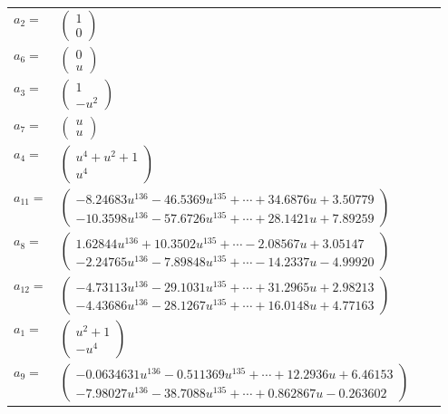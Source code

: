 \documentclass[1p]{elsarticle_modified}
\theoremstyle{definition}
\begin{document}
\begin{tabular}{m{7pt} m{180pt} m{7pt} m{180pt} }
\flushright $a_{2}=$&$\begin{pmatrix}1\\0\end{pmatrix}$ \\
\flushright $a_{6}=$&$\begin{pmatrix}0\\u\end{pmatrix}$ \\
\flushright $a_{3}=$&$\begin{pmatrix}1\\- u^2\end{pmatrix}$ \\
\flushright $a_{7}=$&$\begin{pmatrix}u\\u\end{pmatrix}$ \\
\flushright $a_{4}=$&$\begin{pmatrix}u^4+u^2+1\\u^4\end{pmatrix}$ \\
\flushright $a_{11}=$&$\begin{pmatrix}-8.24683 u^{136}-46.5369 u^{135}+\cdots+34.6876 u+3.50779\\-10.3598 u^{136}-57.6726 u^{135}+\cdots+28.1421 u+7.89259\end{pmatrix}$ \\
\flushright $a_{8}=$&$\begin{pmatrix}1.62844 u^{136}+10.3502 u^{135}+\cdots-2.08567 u+3.05147\\-2.24765 u^{136}-7.89848 u^{135}+\cdots-14.2337 u-4.99920\end{pmatrix}$ \\
\flushright $a_{12}=$&$\begin{pmatrix}-4.73113 u^{136}-29.1031 u^{135}+\cdots+31.2965 u+2.98213\\-4.43686 u^{136}-28.1267 u^{135}+\cdots+16.0148 u+4.77163\end{pmatrix}$ \\
\flushright $a_{1}=$&$\begin{pmatrix}u^2+1\\- u^4\end{pmatrix}$ \\
\flushright $a_{9}=$&$\begin{pmatrix}-0.0634631 u^{136}-0.511369 u^{135}+\cdots+12.2936 u+6.46153\\-7.98027 u^{136}-38.7088 u^{135}+\cdots+0.862867 u-0.263602\end{pmatrix}$ \\

\end{tabular}
\end{document}
